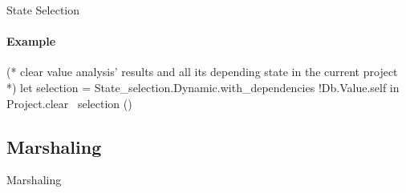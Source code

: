 
\begin{frame}[fragile]{State Selection}
  \framesubtitle{Example}
  
  \begin{ocamlcode}
(* clear value analysis' results
   and all its depending state
   in the current project *)
let selection =
  State_selection.Dynamic.with_dependencies 
    !Db.Value.self
in
Project.clear ~selection ()
  \end{ocamlcode}

\end{frame}


\subsection{Marshaling}

\begin{frame}{Marshaling}
\end{frame}
